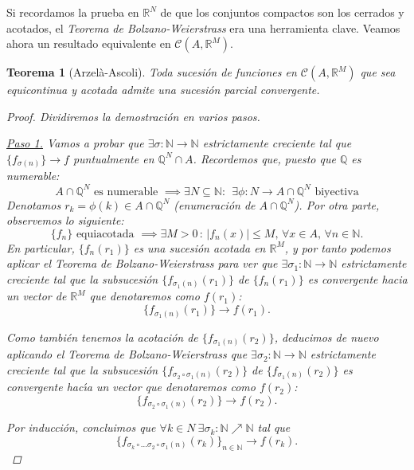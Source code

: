 \documentclass[11pt, a4paper]{article}
\newcommand{\N}{\mathbb{N}}
\theoremstyle{theorem-style}
\newtheorem{nth}{Teorema}[section]
\theoremstyle{definition-style}
\theoremstyle{remark-style}
\theoremstyle{example-style}
\begin{document}
Si recordamos la prueba en $\mathbb{R}^N$ de que los conjuntos compactos son los cerrados y acotados, el \textit{Teorema de Bolzano-Weierstrass} era una herramienta clave. Veamos ahora un resultado equivalente en $\mathcal{C}(A,\mathbb{R}^M)$.

\begin{nth}[Arzelà-Ascoli] \label{6} Toda sucesión de funciones en $\mathcal{C}(A,\mathbb{R}^M)$ que sea equicontinua y acotada admite una sucesión parcial convergente.

  \begin{proof} Dividiremos la demostración en varios pasos.

    \underline{Paso 1.} Vamos a probar que $\exists \sigma : \mathbb{N} \to \mathbb{N}$ estrictamente creciente tal que $\{f_{\sigma(n)}\} \to f$ puntualmente en $\mathbb{Q}^N\cap A$.
    Recordemos que, puesto que $\mathbb Q$ es numerable:
    \[
      A\cap \mathbb Q^N \mbox{ es numerable } \implies \exists N\subseteq \N: \ \
      \exists \phi :N \longrightarrow  A\cap \mathbb Q^N  \mbox{ biyectiva}
    \]
    Denotamos $r_k=\phi(k) \in  A\cap \mathbb Q^N $ (enumeraci\'on de $A\cap \mathbb Q^N $). Por otra parte, observemos lo siguiente:
    \[
      \{f_n \} \mbox{ equiacotada } \implies \exists M>0 \, : \, |f_n(x) |\leq M , \, \forall x\in A , \, \forall n\in \mathbb N.
    \]
    En particular, $\{ f_n (r_1)\}$ es una sucesi\'on acotada en $\mathbb R^M$, y por tanto podemos aplicar el \textit{Teorema de Bolzano-Weierstrass} para ver que $\exists \sigma_1:\mathbb N \longrightarrow \mathbb N$ estrictamente creciente tal que la subsucesión $\{ f_{\sigma_1 (n)} (r_1) \}$ de $\{ f_{n} (r_1) \}$ es convergente hacia un vector de  $\mathbb R^M$  que denotaremos como $f(r_1)$:
    \[
      \{ f_{\sigma_1 (n)} (r_1) \} \longrightarrow f(r_1).
    \]

    Como también tenemos la acotaci\'on de $\{ f_{\sigma_1 (n)} (r_2) \} $, deducimos de nuevo aplicando el \textit{Teorema de Bolzano-Weierstrass} que $\exists \sigma_2:\mathbb N \longrightarrow \mathbb N$ estrictamente creciente tal que la subsucesión $\{ f_{\sigma_2 \circ\sigma_1 (n)} (r_2) \}$ de $\{ f_{\sigma_1 (n)} (r_2) \}$ es convergente hac\'{\i}a un vector que denotaremos como $f(r_2)$:
    \[
      \{ f_{\sigma_2 \circ \sigma_1 (n)} (r_2) \} \longrightarrow f(r_2).
    \]

    Por inducci\'on, concluimos que
    $
    \forall k\in N \ \exists \sigma_k :\mathbb N \nearrow  \mathbb N   
    $ tal que
    \[
      \{ f_{\sigma_k \circ \dots \sigma_2 \circ\sigma_1 (n)} (r_k) \}_{n\in\mathbb N}  \longrightarrow f(r_k).
    \]


\end{proof}
\end{nth}
\end{document}
